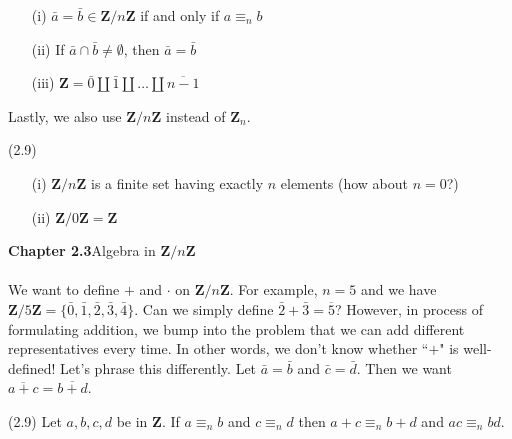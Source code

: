 \begin{rmk}
\begin{itemize}
\item[(i)] $\bar{a}=\bar{b}\in {\bm Z}/n{\bm Z}$ if and only if $a\equiv_{n}b$
\item[(ii)] If $\bar{a}\cap \bar{b}\ne \emptyset$, then $\bar{a}=\bar{b}$
\item[(iii)] ${\bm Z}=\bar{0}\coprod \bar{1}\coprod \ldots \coprod \overline{n-1}$
\end{itemize}
Lastly, we also use ${\bm Z}/n{\bm Z}$ instead of ${\bm Z}_{n}$.
\end{rmk}
\vspace{2ex}
\begin{rmk}
(2.9) 
\begin{itemize}
	\item[(i)] ${\bm Z}/n{\bm Z}$ is a finite set having exactly $n$ elements (how about $n=0$?)
	\item[(ii)] ${\bm Z}/0{\bm Z}={\bm Z}$
\end{itemize}
\end{rmk} 
\vspace{2ex}
{\bf Chapter 2.3}\hspace{2ex}Algebra in ${\bm Z}/n{\bm Z}$
\\\\
We want to define $+$ and $\cdot $ on ${\bm Z}/n{\bm Z}$. For example, $n=5$ and we have ${\bm Z}/5{\bm Z}=\{\bar{0},\bar{1},\bar{2},\bar{3},\bar{4} \}$. Can we simply define $\bar{2}+\bar{3}=\overline{5}$? However, in process of formulating addition, we bump into the problem that we can add different representatives every time. In other words, we don't know whether ``$+$" is well-defined! Let's phrase this differently. Let $\bar{a}=\bar{b}$ and $\bar{c}=\bar{d}$. Then we want $\overline{a+c}=\overline{b+d}$.
\\
\begin{lem}
(2.9) Let $a,b,c, d$ be in ${\bm Z}$. If $a \equiv_{n}b$ and $c\equiv_{n}d$ then $a+c\equiv_{n}b+d$ and $ac\equiv_{n}bd$.
\end{lem}
\vspace{2ex}

